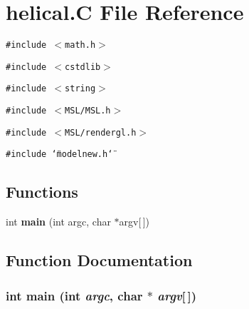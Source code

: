 \section{helical.C File Reference}
\label{helical_8C}
{\tt \#include $<$math.h$>$}\par
{\tt \#include $<$cstdlib$>$}\par
{\tt \#include $<$string$>$}\par
{\tt \#include $<$MSL/MSL.h$>$}\par
{\tt \#include $<$MSL/rendergl.h$>$}\par
{\tt \#include \char`\"{}modelnew.h\char`\"{}}\par
\subsection*{Functions}
\begin{CompactItemize}
\item 
int {\bf main} (int argc, char $\ast$argv[$\,$])
\end{CompactItemize}


\subsection{Function Documentation}
\subsubsection{\setlength{\rightskip}{0pt plus 5cm}int main (int {\em argc}, char $\ast$ {\em argv}[$\,$])}\label{helical_8C_a0}


